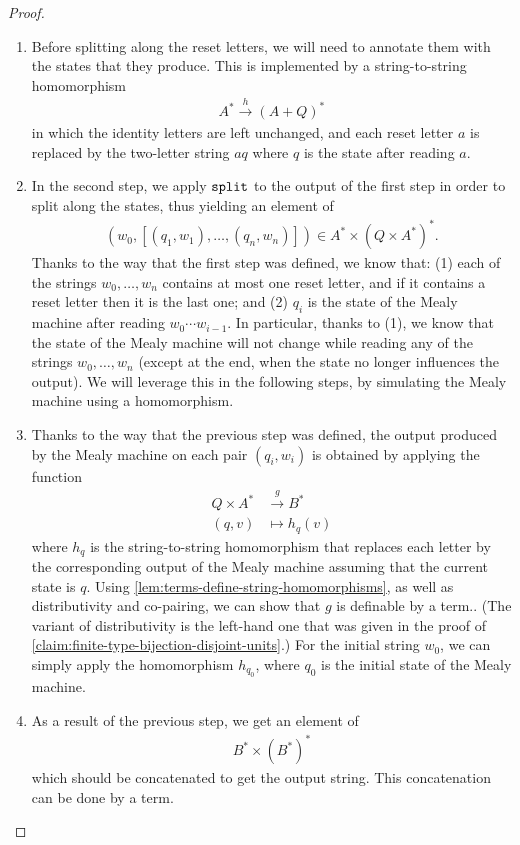 \begin{proof}
    \begin{enumerate}
        \item Before splitting along the reset letters, we will need to annotate them with the states that they produce. This is implemented by a string-to-string homomorphism  
        \begin{align*}
        A^* \xrightarrow h (A+Q)^*
        \end{align*}
        in which the identity letters are left unchanged, and each  reset letter $a$ is replaced by the two-letter string $aq$ where $q$  is the state  after reading $a$.  
        \item In the second step, we apply $\mathtt{split}$ to  the output of the first step in order to split along the states, thus yielding an element of
        \begin{align*}
         (w_0, [(q_1,w_1),\ldots,(q_n,w_n)]) \in  A^* \times (Q \times A^*)^*.
        \end{align*}
        Thanks to the way that the first step was defined, we know that: (1) each of the strings $w_0,\ldots,w_n$ contains at most one reset letter, and if it contains a reset letter then it is the last one; and  (2)  $q_i$ is the state of the Mealy machine after reading $w_0 \cdots w_{i-1}$. In particular, thanks to (1), we know that the state of the Mealy machine will not change while reading any of the strings $w_0,\ldots,w_n$ (except at the end, when the state no longer influences the output). We will leverage this in the following steps, by simulating the Mealy machine using a homomorphism. 
        \item Thanks to the way that the previous step was defined, the output produced by the Mealy machine on each pair $(q_i,w_i)$ is obtained by applying the function 
        \begin{align*}
                Q \times A^* & \xrightarrow g B^*\\ 
                (q,v) & \mapsto h_q(v)
        \end{align*}
        where $h_q$ is the string-to-string homomorphism that replaces each letter by the corresponding output of the Mealy machine assuming that the current state is $q$.  Using \cref{lem:terms-define-string-homomorphisms}, as well as distributivity and co-pairing, we can show that $g$ is definable by a term.. (The variant of distributivity is the left-hand one that was given in the proof of \cref{claim:finite-type-bijection-disjoint-units}.)  For the initial string $w_0$, we can simply apply the homomorphism $h_{q_0}$, where $q_0$ is the initial state of the Mealy machine.
        \item As a result of the previous step, we get an element of 
            \begin{align*}
            B^* \times (B^*)^*
            \end{align*}
            which should be concatenated to get the output string. This concatenation can be done by a term. 
    \end{enumerate}
\end{proof}

